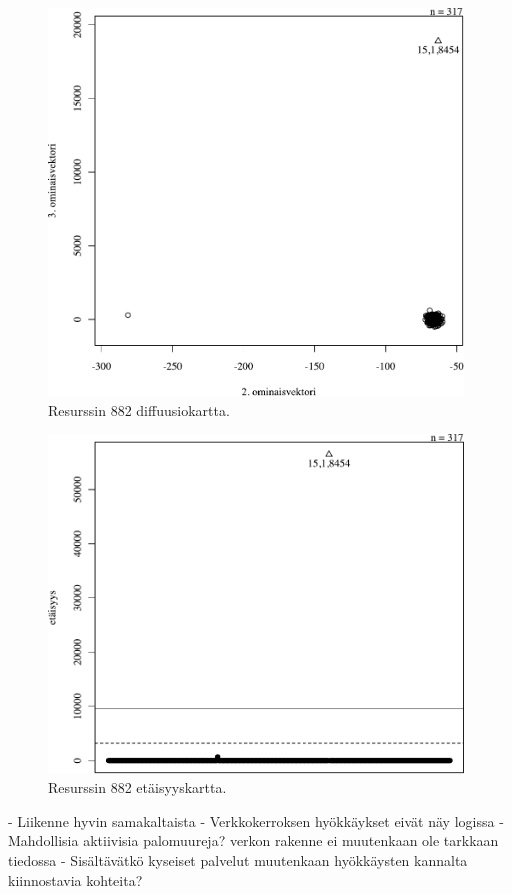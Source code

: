 \begin{figure}[p]
\centering
\includegraphics[width=11cm]{pics/diffuusiokuvat/service_882.pdf}
\caption{Resurssin 882 diffuusiokartta.}
\label{diffusio_882}
\end{figure}

\begin{figure}[p]
\centering
\includegraphics[width=11cm]{pics/tiheyskuvat/service_882.pdf}
\caption{Resurssin 882  etäisyyskartta.}
\label{service_882}
\end{figure}

- Liikenne hyvin samakaltaista
- Verkkokerroksen hyökkäykset eivät näy logissa
- Mahdollisia aktiivisia palomuureja? verkon rakenne ei muutenkaan ole tarkkaan tiedossa
- Sisältävätkö kyseiset palvelut muutenkaan hyökkäysten kannalta kiinnostavia kohteita?


